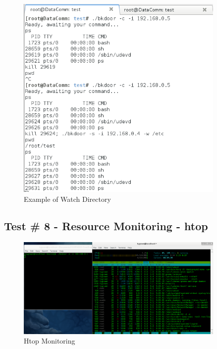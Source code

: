 \documentclass[titlepage]{article}
\begin{document}
\begin{figure}[htb]                                                                       
  \begin{center}
    \includegraphics[width=0.9\textwidth]{Pictures/Watch.png}
  \end{center}
  \caption{Example of Watch Directory}
  \label{fig:watch}
\end{figure}

\clearpage

\subsection{Test \# 8 - Resource Monitoring - htop}

\begin{figure}[htb]                                                                       
  \begin{center}
    \includegraphics[width=0.9\textwidth]{Pictures/htop.png}
  \end{center}
  \caption{Htop Monitoring}
  \label{fig:htop}
\end{figure}
\end{document}

